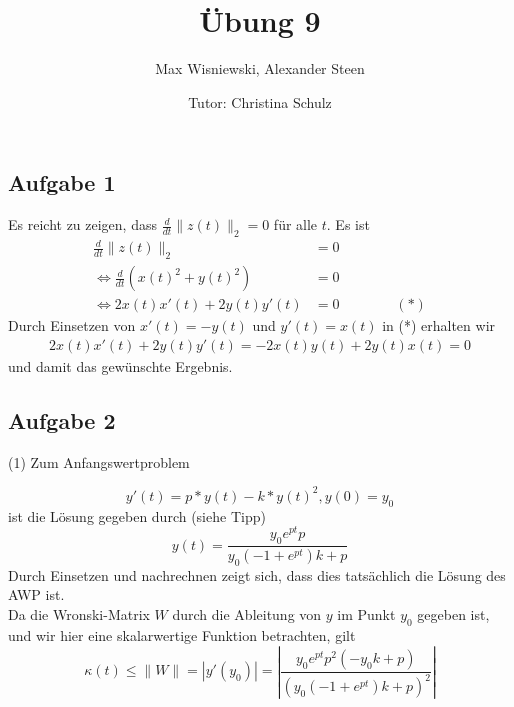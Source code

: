 \documentclass[11pt,a4paper,ngerman]{article}
\date{Tutor: Christina Schulz}
\title{Übung 9}
\author{Max Wisniewski, Alexander Steen}
\begin{document}

\renewcommand{\figurename}{Figure}

\maketitle
\thispagestyle{fancy}

\subsection*{Aufgabe 1}
Es reicht zu zeigen, dass $\frac{d}{dt} \|z(t) \|_2 = 0$ für alle $t$. Es ist
\begin{equation*}\begin{split}
\frac{d}{dt} \|z(t) \|_2 &= 0 \\
\Leftrightarrow  \frac{d}{dt} (x(t)^2 + y(t)^2) &= 0 \\
\Leftrightarrow 2 x(t) x'(t)+2 y(t) y'(t) &= 0 \qquad \qquad (*)
\end{split}\end{equation*}
Durch Einsetzen von $x'(t) = -y(t)$ und $y'(t) = x(t)$ in (*) erhalten wir
\begin{equation*}\begin{split}
 2 x(t) x'(t)+2 y(t) y'(t) =  -2 x(t) y(t)+2 y(t)  x(t) = 0
\end{split}\end{equation*}
und damit das gewünschte Ergebnis.


\subsection*{Aufgabe 2}
(1) Zum Anfangswertproblem

$$ y'(t) = p*y(t) - k*y(t)^2, y(0) = y_0$$
 ist die Lösung gegeben durch (siehe Tipp)
$$  y(t) =  \frac{y_0 e^{pt} p}{y_0 (-1+e^{pt}) k+p} $$
Durch Einsetzen und nachrechnen zeigt sich, dass dies tatsächlich die Lösung des AWP ist. \\

Da die Wronski-Matrix $W$ durch die Ableitung von $y$ im Punkt $y_0$ gegeben ist, und wir hier eine skalarwertige Funktion betrachten, gilt
$$ \kappa(t) \leq \| W \| = |y'(y_0)| = \left|\frac{y_0 e^{p t} p^2 (-y_0 k+p)}{(y_0 (-1+e^{p t}) k+p)^2}\right| $$
\end{document}
